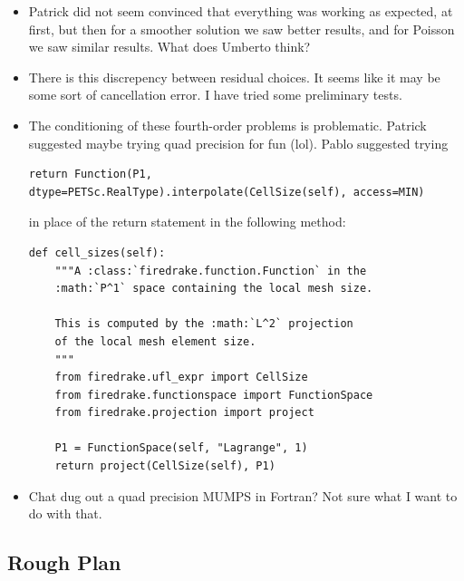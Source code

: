 \documentclass[12pt,a4paper]{article}
\begin{document}
\begin{itemize}
\begin{itemize}
        \item I tested the resulting solver on a manufactured 1D biharmonic problem. I compared the results with the refinement scheme and with uniform refinement. These results seem promising? (take a look)
            \end{itemize}
    \item Patrick did not seem convinced that everything was working as expected, at first, but then for a smoother solution we saw better results, and for Poisson we saw similar results. What does Umberto think?
    \item There is this discrepency between residual choices. It seems like it may be some sort of cancellation error. I have tried some preliminary tests.
    \item The conditioning of these fourth-order problems is problematic. Patrick suggested maybe trying quad precision for fun (lol). Pablo suggested trying \begin{lstlisting}
return Function(P1, dtype=PETSc.RealType).interpolate(CellSize(self), access=MIN)
\end{lstlisting}
in place of the return statement in the following method:
\begin{lstlisting}
def cell_sizes(self):
    """A :class:`firedrake.function.Function` in the
    :math:`P^1` space containing the local mesh size.

    This is computed by the :math:`L^2` projection
    of the local mesh element size.
    """
    from firedrake.ufl_expr import CellSize
    from firedrake.functionspace import FunctionSpace
    from firedrake.projection import project

    P1 = FunctionSpace(self, "Lagrange", 1)
    return project(CellSize(self), P1)
\end{lstlisting}
\item Chat dug out a quad precision MUMPS in Fortran? Not sure what I want to do with that. 
\end{itemize}

\subsection{Rough Plan}
\end{document}
